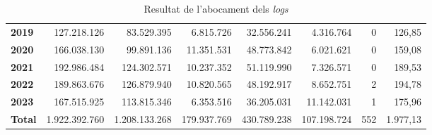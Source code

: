\begin{table}[h!]
\begin{adjustbox}{width=1.5\textwidth, center}
\begin{tabular}{|l|r|r|r|r|r|r|r|}
            \textbf{2019}       & 127.218.126           & 83.529.395            & 6.815.726                 & 32.556.241            & 4.316.764                 & 0             & 126,85        \\
            \textbf{2020}       & 166.038.130           & 99.891.136            & 11.351.531                & 48.773.842            & 6.021.621                 & 0             & 159,08        \\
            \textbf{2021}       & 192.986.484           & 124.302.571           & 10.237.352                & 51.119.990            & 7.326.571                 & 0             & 189,53        \\
            \textbf{2022}       & 189.863.676           & 126.879.940           & 10.820.565                & 48.192.917            & 8.652.751                 & 2             & 194,78        \\
            \textbf{2023}       & 167.515.925           & 113.815.346           & 6.353.516                 & 36.205.031            & 11.142.031                & 1             & 175,96        \\
            \midrule
            \textbf{Total}      & 1.922.392.760         & 1.208.133.268         & 179.937.769               & 430.789.238           & 107.198.724               & 552           & 1.977,13      \\
            \bottomrule
        \end{tabular}
    \end{adjustbox}
    \caption{Resultat de l'abocament dels \textit{logs}}
    \label{tab:logs-table}
\end{table}
